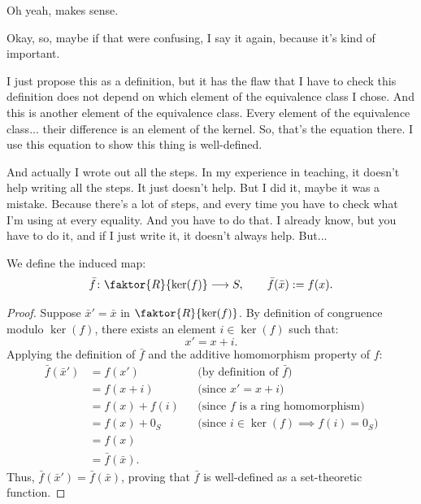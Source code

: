 \begin{proofWrapper}
\begin{student}
Oh yeah, makes sense.
\end{student}

\begin{speech}[00:57:48 - 00:58:44]
Okay, so, maybe if that were confusing, I say it again, because it's kind of important. 

I just propose this as a definition, but it has the flaw that I have to check this definition does not depend on which element of the equivalence class I chose. And this is another element of the equivalence class. Every element of the equivalence class... their difference is an element of the kernel. So, that's the equation there. I use this equation to show this thing is well-defined. 

And actually I wrote out all the steps. In my experience in teaching, it doesn't help writing all the steps. It just doesn't help. But I did it, maybe it was a mistake. Because there's a lot of steps, and every time you have to check what I'm using at every equality. And you have to do that. I already know, but you have to do it, and if I just write it, it doesn't always help. But...
\end{speech}

\begin{content}
We define the induced map:
\begin{equation}\label{eq:induced-map-def}
\bar{f} \colon \faktor{R}{\ker(f)} \longrightarrow S, \qquad \bar{f}(\bar{x}) := f(x).
\end{equation}


\begin{proof}
Suppose $\bar{x}' = \bar{x}$ in $\faktor{R}{\ker(f)}$. By definition of congruence modulo $\ker(f)$, there exists an element $i \in \ker(f)$ such that:
\[
x' = x + i.
\]
Applying the definition of $\bar{f}$ and the additive homomorphism property of $f$:
\begin{align*}
\bar{f}(\bar{x}') &= f(x') && \text{(by definition of $\bar{f}$)} \\
&= f(x + i) && \text{(since $x' = x + i$)} \\
&= f(x) + f(i) && \text{(since $f$ is a ring homomorphism)} \\
&= f(x) + 0_S && \text{(since $i \in \ker(f) \implies f(i) = 0_S$)} \\
&= f(x) \\
&= \bar{f}(\bar{x}).
\end{align*}
Thus, $\bar{f}(\bar{x}') = \bar{f}(\bar{x})$, proving that $\bar{f}$ is well-defined as a set-theoretic function.
\end{proof}
\end{content}


\end{proofWrapper}
